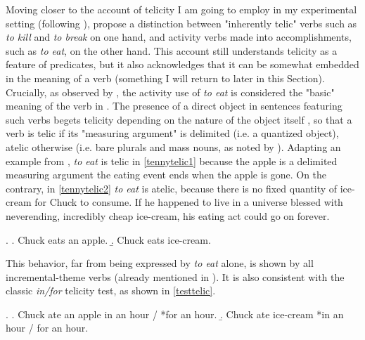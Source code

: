 Moving closer to the account of telicity I am going to employ in my experimental setting (following \textcite{Medina2007}), \textcite[112]{vanvalinlapolla1997syntax} propose a distinction between "inherently telic" verbs such as \textit{to kill} and \textit{to break} on one hand, and activity verbs made into accomplishments, such as \textit{to eat}, on the other hand. This account still understands telicity as a feature of predicates, but it also acknowledges that it can be somewhat embedded in the meaning of a verb (something I will return to later in this Section). Crucially, as observed by \textcite[5-6]{NewmanRice2006}, the activity use of \textit{to eat} is considered the "basic" meaning of the verb in \textcite{vanvalinlapolla1997syntax}. The presence of a direct object in sentences featuring such verbs begets telicity depending on the nature of the object itself \parencite{tenny1994aspectual, dowty1991thematic}, so that a verb is telic if its "measuring argument" is delimited (i.e. a quantized object), atelic otherwise (i.e. bare plurals and mass nouns, as noted by \textcite{verkuyl1972compositional, verkuyl1989aspectual}). Adapting an example from \textcite[24]{tenny1994aspectual}, \textit{to eat} is telic in \ref{tennytelic1} because the apple is a delimited measuring argument \textemdash the eating event ends when the apple is gone. On the contrary, in \ref{tennytelic2} \textit{to eat} is atelic, because there is no fixed quantity of ice-cream for Chuck to consume. If he happened to live in a universe blessed with neverending, incredibly cheap ice-cream, his eating act could go on forever.

\ex. \label{tennytelic} \a. \label{tennytelic1} Chuck eats an apple.
\b. \label{tennytelic2} Chuck eats ice-cream.

This behavior, far from being expressed by \textit{to eat} alone, is shown by all incremental-theme verbs (already mentioned in ). It is also consistent with the classic \textit{in/for} telicity test, as shown in \ref{testtelic}.

\ex. \label{testtelic} \a. \label{testtelic1} Chuck ate an apple in an hour / *for an hour.
\b. \label{testtelic2} Chuck ate ice-cream *in an hour / for an hour.

